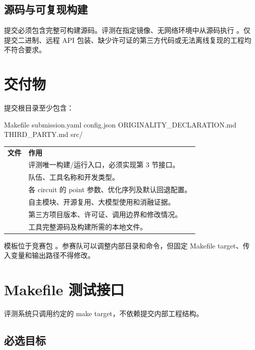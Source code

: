 \documentclass[UTF8,a4paper,11pt,fontset=fandol]{ctexart}
\begin{document}
\subsection{源码与可复现构建}

提交必须包含完整可构建源码。评测在指定镜像、无网络环境中从源码执行 。仅提交二进制、远程 API 包装、缺少许可证的第三方代码或无法离线复现的工程均不符合要求。

\section{交付物}

提交根目录至少包含：

\begin{codebox}[breakable=false,listing options={style=contestcode,basicstyle=\ttfamily\footnotesize}]
Makefile
submission.yaml
config.json
ORIGINALITY_DECLARATION.md
THIRD_PARTY.md
src/
\end{codebox}

\begin{table}[H]
\centering
\begin{tabularx}{\textwidth}{p{}Y}
\bfseries 文件 & \bfseries 作用 \\
 & 评测唯一构建/运行入口，必须实现第 3 节接口。 \\
 & 队伍、工具名称和开发类型。 \\
 & 各 circuit 的 point 参数、优化序列及默认回退配置。 \\
 & 自主模块、开源复用、大模型使用和消融证据。 \\
 & 第三方项目版本、许可证、调用边界和修改情况。 \\
 & 工具完整源码及构建所需的本地文件。 \\
\end{tabularx}
\end{table}

模板位于竞赛包 。参赛队可以调整内部目录和命令，但固定 Makefile target、传入变量和输出路径不得修改。

\section{Makefile 测试接口}

评测系统只调用约定的 make target，不依赖提交内部工程结构。

\subsection{必选目标}
\end{document}
